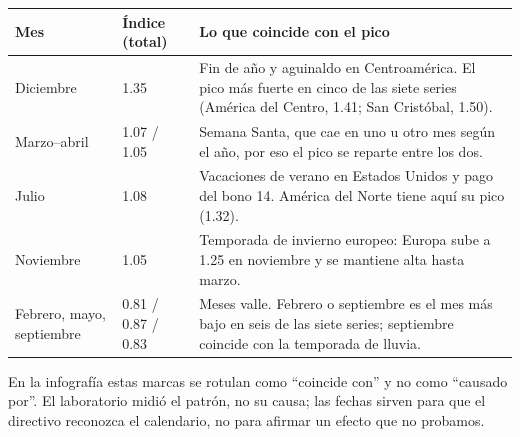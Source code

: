 \begin{center}
\begin{tabularx}{\textwidth}{@{}llX@{}}
\toprule
Mes & Índice (total) & Lo que coincide con el pico \\
\midrule
Diciembre      & 1.35 & Fin de año y aguinaldo en Centroamérica. El pico más fuerte en
                         cinco de las siete series (América del Centro, 1.41;
                         San Cristóbal, 1.50). \\
Marzo--abril   & 1.07 / 1.05 & Semana Santa, que cae en uno u otro mes según el año, por eso
                         el pico se reparte entre los dos. \\
Julio          & 1.08 & Vacaciones de verano en Estados Unidos y pago del bono 14.
                         América del Norte tiene aquí su pico (1.32). \\
Noviembre      & 1.05 & Temporada de invierno europeo: Europa sube a 1.25 en noviembre
                         y se mantiene alta hasta marzo. \\
\midrule
Febrero, mayo, septiembre & 0.81 / 0.87 / 0.83 & Meses valle. Febrero o septiembre es el mes más bajo
                         en seis de las siete series; septiembre coincide con la temporada de lluvia. \\
\bottomrule
\end{tabularx}
\end{center}

En la infografía estas marcas se rotulan como ``coincide con'' y no como
``causado por''. El laboratorio midió el patrón, no su causa; las fechas sirven
para que el directivo reconozca el calendario, no para afirmar un efecto que no
probamos.
